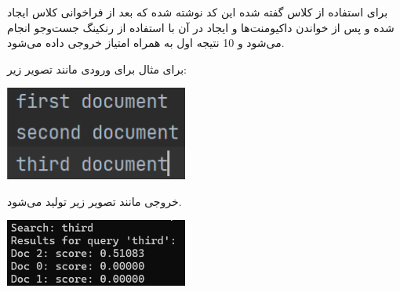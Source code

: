 \documentclass[12pt, dvipsnames, svgnames, x11names,]{article}
\begin{document}
		{\normalsize 
			برای استفاده از کلاس گفته شده این کد نوشته شده که بعد از فراخوانی کلاس ایجاد شده و پس از خواندن داکیومنت‌ها و ایجاد  در آن با استفاده از رنکینگ  جست‌و‌جو انجام می‌شود و 10 نتیجه اول به همراه امتیاز خروجی داده می‌شود.
		}		
		
		{\normalsize برای مثال برای ورودی مانند تصویر زیر:}
		
		\begin{center}
			{\includegraphics[width=6cm]{images/09.png}} \par
		\end{center}
		
		{\normalsize خروجی مانند تصویر زیر تولید می‌شود.}
		
		\begin{center}
			{\includegraphics[width=6cm]{images/10.png}} \par
		\end{center}
	
\end{document}
